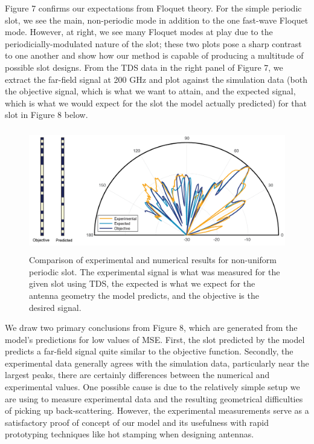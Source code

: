 \documentclass[11pt]{article}
\begin{document}
\noindent Figure 7 confirms our expectations from Floquet theory. For the simple periodic slot, we see the main, non-periodic mode in addition to the one fast-wave Floquet mode. However, at right, we see many Floquet modes at play due to the periodicially-modulated nature of the slot; these two plots pose a sharp contrast to one another and show how our method is capable of producing a multitude of possible slot designs. From the TDS data in the right panel of Figure 7, we extract the far-field signal at 200 GHz and plot against the simulation data (both the objective signal, which is what we want to attain, and the expected signal, which is what we would expect for the slot the model actually predicted) for that slot in Figure 8 below.

\begin{figure}[H]
	\centering
	\includegraphics[height=2.1in]{figures/477exppdf2}
	\caption{Comparison of experimental and numerical results for non-uniform periodic slot. The experimental signal is what was measured for the given slot using TDS, the expected is what we expect for the antenna geometry the model predicts, and the objective is the desired signal.}
\end{figure}

\noindent We draw two primary conclusions from Figure 8, which are generated from the model's predictions for low values of MSE. First, the slot predicted by the model predicts a far-field signal quite similar to the objective function. Secondly, the experimental data generally agrees with the simulation data, particularly near the largest peaks, there are certainly differences between the numerical and experimental values. One possible cause is due to the relatively simple setup we are using to measure experimental data and the resulting geometrical difficulties of picking up back-scattering. However, the experimental measurements serve as a satisfactory proof of concept of our model and its usefulness with rapid prototyping techniques like hot stamping when designing antennas. 
\end{document}
